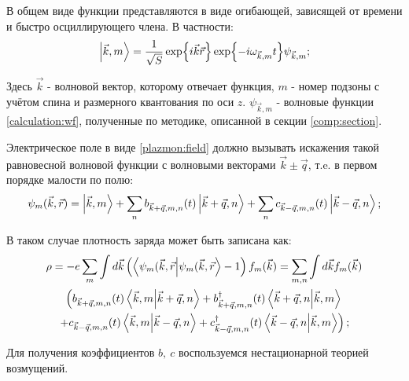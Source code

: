 \documentclass[../main.tex]{subfiles}
\begin{document}
    В общем виде функции представляются в виде огибающей, зависящей 
    от времени и быстро осциллирующего члена. В частности:
    \begin{equation}
        \label{plasmons:wf0}
        \ket{\vec k, m} = \frac{1}{\sqrt S} \exp{i\vec k \vec r}
            \exp{-i \omega_{\vec k, m} t} \psi_{\vec k, m};
    \end{equation}

    Здесь $\vec k$ - волновой вектор, которому отвечает функция, 
    $m$ - номер подзоны с учётом спина и размерного квантования 
    по оси $z$. $\psi_{\vec k, m}$ - волновые функции
    \ref{calculation:wf}, полученные по методике, 
    описанной в секции \ref{comp:section}. 

    Электрическое поле в виде \ref{plazmon:field} должно вызывать 
    искажения 
    такой равновесной волновой функции с волновыми векторами
    $\vec k \pm \vec q$, т.e. в первом порядке малости по полю:
    \begin{equation}
        \label{plasmons:wf1}
        \psi_m (\vec k, \vec r) = \ket{\vec k, m} + \sum_n b_{\vec k 
            + \vec q, m, n} (t) \ket{\vec k + \vec q, n} + \sum_n 
            c_{\vec k - \vec q, m, n} (t) \ket{\vec k - \vec q, n};
    \end{equation}

    В таком случае плотность заряда может быть записана как:
    \begin{multline}
        \label{charge_density}
        \rho = -e \sum_{m} \int d\vec k  \left(
            \bra{\psi_m (\vec k, \vec r}\ket{\psi_m (\vec k, 
            \vec r} - 1\right) f_m(\vec k) =
            \sum_{m, n} \int d \vec k f_m (\vec k) \\
            \left( b_{\vec k + \vec q, m, n} (t)
            \bra{\vec k, m} \ket{\vec k 
            + \vec q, n} + b^\dagger_{\vec k + \vec q, m, n} (t) 
            \bra{\vec k + \vec q, n} \ket{\vec k, m}\right.\\ 
            \left. + c_{\vec k - \vec q, m, n} (t) \bra{\vec k, m} 
            \ket{\vec k  - \vec q, n} + c^\dagger_{\vec k - \vec q, m, n} 
            (t) \bra{\vec k - \vec q, n} \ket{\vec k, m} \right);
    \end{multline}
    
    Для получения коэффициентов $b,~c$ воспользуемся нестационарной 
    теорией возмущений.
\end{document}
